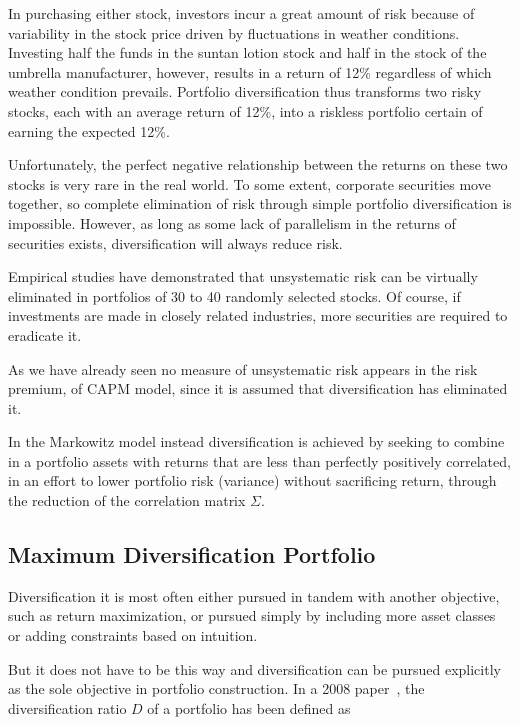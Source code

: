 In purchasing either stock, investors incur a great amount of risk because of variability in the stock price driven by fluctuations in weather conditions. Investing half the funds in the suntan lotion stock and half in the stock of the umbrella manufacturer, however, results in a return of 12\% regardless of which weather condition prevails. Portfolio diversification thus transforms two risky stocks, each with an average return of 12\%, into a riskless portfolio certain of earning the expected 12\%.

Unfortunately, the perfect negative relationship between the returns on these two stocks is very rare in the real world. To some extent, corporate securities move together, so complete elimination of risk through simple portfolio diversification is impossible. However, as long as some lack of parallelism in the returns of securities exists, diversification will always reduce risk.

Empirical studies have demonstrated that unsystematic risk can be virtually eliminated in portfolios of 30 to 40 randomly selected stocks. Of course, if investments are made in closely related industries, more securities are required to eradicate it.

As we have already seen no measure of unsystematic risk appears in the risk premium, of CAPM model, since it is assumed that diversification has eliminated it.

In the Markowitz model instead diversification is achieved by seeking to combine in a portfolio assets with returns that are less than perfectly positively correlated, in an effort to lower portfolio risk (variance) without sacrificing return, through the reduction of the correlation matrix $\Sigma$.

\subsection{Maximum Diversification Portfolio}
\label{maximum-diversification-portfolio}

Diversification it is most often either pursued in tandem with another objective, such as return maximization, or pursued simply by including more asset classes or adding constraints based on intuition.

But it does not have to be this way and diversification can be pursued explicitly as the sole objective in portfolio construction.
In a 2008 paper~\cite{bib:diversification}, the diversification ratio $D$ of a portfolio has been defined as

